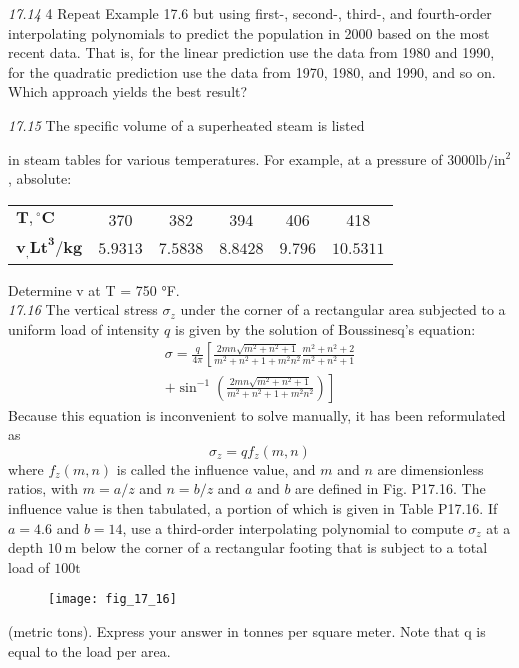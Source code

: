 \documentclass[../main.tex]{subfiles}
\begin{document}
\begin{multicols}{2}
\noindent\textit{17.14} 4 Repeat Example 17.6 but using first-, second-, third-,
and fourth-order interpolating polynomials to predict the
population in 2000 based on the most recent data. That is, for
the linear prediction use the data from 1980 and 1990, for the
quadratic prediction use the data from 1970, 1980, and 1990,
and so on. Which approach yields the best result?

\noindent\textit{17.15} The specific volume of a superheated steam is listed

in steam tables for various temperatures. For example, at a pressure of $3000 \mathrm{lb} / \mathrm{in}^{2}$, absolute:
\begin{tabular}{lccccc}
\hline $\boldsymbol{T},{ }^{\circ} \mathbf{C}$ & 370 & 382 & 394 & 406 & 418 \\
$\boldsymbol{v}_{\boldsymbol{,}} \mathbf{L t}^{\mathbf{3}} / \mathbf{k g}$ & $5.9313$ & $7.5838$ & $8.8428$ & $9.796$ & $10.5311$ \\
\hline
\end{tabular}
Determine v at T = 750 °F.\\

\noindent\textit{17.16} The vertical stress $\sigma_{z}$ under the corner of a rectangular area subjected to a uniform load of intensity $q$ is given by the solution of Boussinesq's equation:
$$
\begin{array}{r}
\sigma=\frac{q}{4 \pi}\left[\frac{2 m n \sqrt{m^{2}+n^{2}+1}}{m^{2}+n^{2}+1+m^{2} n^{2}} \frac{m^{2}+n^{2}+2}{m^{2}+n^{2}+1}\right. \\
\left.+\sin ^{-1}\left(\frac{2 m n \sqrt{m^{2}+n^{2}+1}}{m^{2}+n^{2}+1+m^{2} n^{2}}\right)\right]
\end{array}
$$
Because this equation is inconvenient to solve manually, it has been reformulated as
$$
\sigma_{z}=q f_{z}(m, n)
$$
where $f_{z}(m, n)$ is called the influence value, and $m$ and $n$ are dimensionless ratios, with $m=a / z$ and $n=b / z$ and $a$ and $b$ are defined in Fig. P17.16. The influence value is then tabulated, a portion of which is given in Table P17.16. If $a=4.6$ and $b=14$, use a third-order interpolating polynomial to compute $\sigma_{z}$ at a depth $10 \mathrm{~m}$ below the corner of a rectangular footing that is subject to a total load of $100 \mathrm{t}$
\begin{figure}[H]
    \centering
    \texttt{[image: fig\_17\_16]}
   \caption{\textsf{}}\label{fig:fig_17_16}
\end{figure}
(metric tons). Express your answer in tonnes per square
meter. Note that q is equal to the load per area.


\end{multicols}
\end{document}
